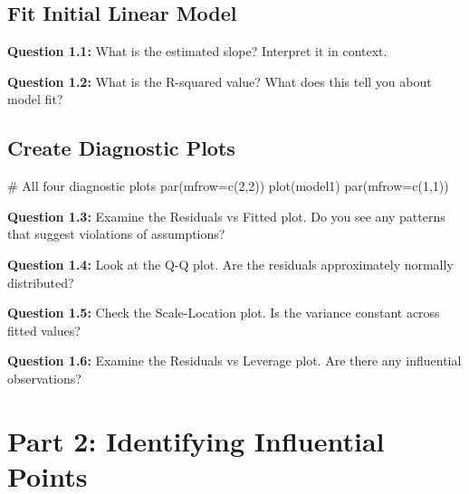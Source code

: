 \documentclass[11pt]{article}
\begin{document}
\subsection{Fit Initial Linear Model}


\textbf{Question 1.1:} What is the estimated slope? Interpret it in context.

\vspace{0.5cm}

\textbf{Question 1.2:} What is the R-squared value? What does this tell you about model fit?

\vspace{0.5cm}

\subsection{Create Diagnostic Plots}

\begin{rcode}
# All four diagnostic plots
par(mfrow=c(2,2))
plot(model1)
par(mfrow=c(1,1))
\end{rcode}

\textbf{Question 1.3:} Examine the Residuals vs Fitted plot. Do you see any patterns that suggest violations of assumptions?

\vspace{0.5cm}

\textbf{Question 1.4:} Look at the Q-Q plot. Are the residuals approximately normally distributed?

\vspace{0.5cm}

\textbf{Question 1.5:} Check the Scale-Location plot. Is the variance constant across fitted values?

\vspace{0.5cm}

\textbf{Question 1.6:} Examine the Residuals vs Leverage plot. Are there any influential observations?

\vspace{0.5cm}

\section{Part 2: Identifying Influential Points}
\end{document}
